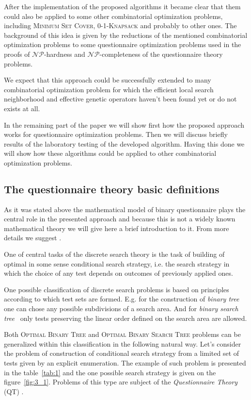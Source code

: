 \documentclass[11pt]{article}
\begin{document}
After the implementation of the proposed algorithms it became clear that them could also be applied to some other combinatorial optimization problems, including \textsc{Minimum Set Cover}, \textsc{0-1-Knapsack} and probably to other ones. The background of this idea is given by the reductions of the mentioned combinatorial optimization problems to some questionnaire optimization problems used in the proofs of $\mathcal{NP}$-hardness and $\mathcal{NP}$-completeness of the questionnaire theory problems.

We expect that this approach could be successfully extended to many combinatorial optimization problem for which the efficient local search neighborhood and effective genetic operators haven't been found yet or do not exists at all.

In the remaining part of the paper we will show first how the proposed approach works for questionnaire optimization problems.  Then we will discuss briefly results of the laboratory testing of the developed algorithm. Having this done we will show how these algorithms could be applied to other combinatorial optimization problems. 

%
%
%
\subsection{The questionnaire theory basic definitions}
As it was stated above the mathematical model of binary questionnaire plays the central role in the presented approach and because this is not a widely known mathematical theory we will give here a brief introduction to it. From more details we suggest \cite{Pi:geq,PaSo:td,ArBo:pds}.

One of central tasks of the discrete search theory is the task of building of optimal in some sense conditional search strategy, i.e. the search strategy in which the choice of any test depends on outcomes of previously applied ones.  

One possible classification of discrete search problems is based on principles according to which test sets are formed. E.g. for the construction of \emph{binary tree}~\cite{H,Sob:gt} one can chose any possible subdivisions of a search area. And for \emph{binary search tree}~\cite{HT,GW} only tests preserving the linear order defined on the search area are allowed.

Both \textsc{Optimal Binary Tree} and \textsc{Optimal Binary Search Tree} problems can be generalized within this classification in the following natural way.  Let's consider the problem of construction of conditional search strategy from a limited set of tests given by an explicit enumeration. The example of such problem is presented in the table~\ref{tab:1} and the one possible search strategy is given on the figure~\ref{fig:3_1}. Problems of this type are subject of the \emph{Questionnaire Theory} (QT) \cite{Pi:geq,PaSo:td,ArCh:obq}. 
\end{document}
